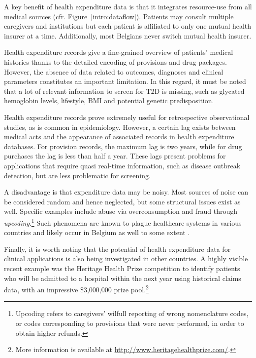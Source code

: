 A key benefit of health expenditure data is that it integrates resource-use from all medical sources (cfr. Figure~\ref{intro:dataflow}). Patients may consult multiple caregivers and institutions but each patient is affiliated to only one mutual health insurer at a time. Additionally, most Belgians never switch mutual health insurer. 

Health expenditure records give a fine-grained overview of patients' medical histories thanks to the detailed encoding of provisions and drug packages. However, the absence of data related to outcomes, diagnoses and clinical parameters constitutes an important limitation. In this regard, it must be noted that a lot of relevant information to screen for T2D is missing, such as glycated hemoglobin levels, lifestyle, BMI and potential genetic predisposition.

Health expenditure records prove extremely useful for retrospective observational studies, as is common in epidemiology. However, a certain lag exists between medical acts  and the appearance of associated records in health expenditure databases. For provision records, the maximum lag is two years, while for drug purchases the lag is less than half a year. These lags present problems for applications that require quasi real-time information, such as disease outbreak detection, but are less problematic for screening.

A disadvantage is that expenditure data may be noisy. Most sources of noise can be considered random and hence neglected, but some structural issues exist as well. Specific examples include abuse via overconsumption and fraud through \emph{upcoding}.\footnote{Upcoding refers to caregivers' wilfull reporting of wrong nomenclature codes, or codes corresponding to provisions that were never performed, in order to obtain higher refunds.} Such phenomena are known to plague healthcare systems in various countries and likely occur in Belgium as well to some extent \citep{silverman2004medicare,steinbusch2007risk,berta2010effects, Azguridiene12022015}.

Finally, it is worth noting that the potential of health expenditure data for clinical applications is also being investigated in other countries. A highly visible recent example was the Heritage Health Prize competition to identify patients who will be admitted to a hospital within the next year using historical claims data, with an impressive \$3,000,000 prize pool.\footnote{More information is available at \url{http://www.heritagehealthprize.com/}.}
